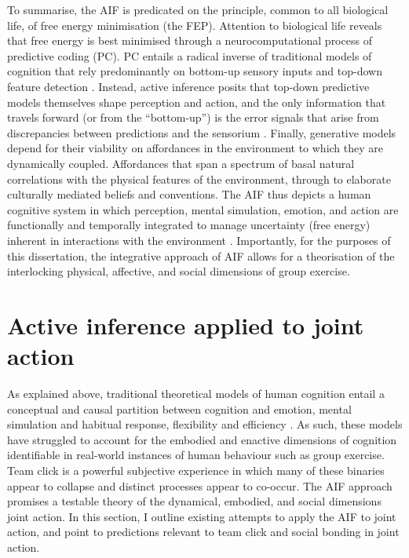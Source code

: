 \begin{CJK}{UTF8}{gbsn}
To summarise, the AIF is predicated on the principle, common to all biological life, of free energy minimisation (the FEP).   Attention to biological life reveals that free energy is best minimised through a neurocomputational process of predictive coding (PC). PC entails a radical inverse of traditional models of cognition that rely predominantly on bottom-up sensory inputs and top-down feature detection \citep[e.g.,][]{Marr1985}. Instead, active inference posits that top-down predictive models themselves shape perception and action, and the only information that travels forward (or from the ``bottom-up'') is the error signals that arise from discrepancies between predictions and the sensorium \citep{Pickering2014}.  Finally, generative models depend for their viability on affordances in the environment to which they are dynamically coupled.  Affordances that span a spectrum of basal natural correlations with the physical features of the environment, through to elaborate culturally mediated beliefs and conventions.  The AIF thus depicts a human cognitive system in which perception, mental simulation, emotion, and action are functionally and temporally integrated to manage uncertainty (free energy) inherent in interactions with the environment \citep{Clark2013}.  Importantly, for the purposes of this dissertation, the integrative approach of AIF allows for a theorisation of the interlocking physical, affective, and social dimensions of group exercise.


\section{Active inference applied to joint action \label{sect:activeInfJA}}
As explained above, traditional theoretical models of human cognition entail a conceptual and causal partition between cognition and emotion, mental simulation and habitual response, flexibility and efficiency \citep{Clark2015}.  As such, these models have struggled to account for the embodied and enactive dimensions of cognition identifiable in real-world instances of human behaviour such as group exercise.  Team click is a powerful subjective experience in which many of these binaries appear to collapse and distinct processes appear to co-occur.  The AIF approach promises a testable theory of the dynamical, embodied, and social dimensions joint action.  In this section, I outline existing attempts to apply the AIF to joint action, and point to predictions relevant to team click and social bonding in joint action.


\end{CJK}

